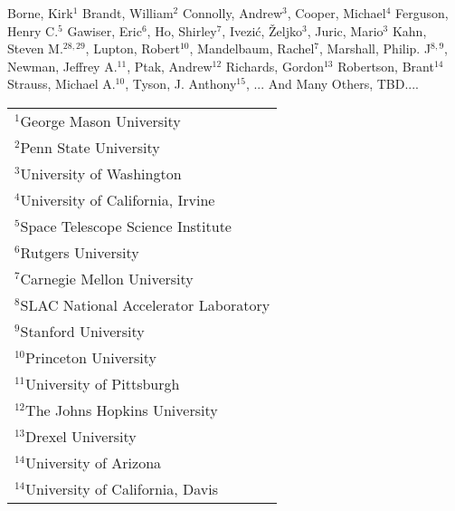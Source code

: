 Borne, Kirk$^{1}$
Brandt, William$^{2}$
Connolly, Andrew$^{3}$,
Cooper, Michael$^{4}$
Ferguson, Henry C.$^{5}$
Gawiser, Eric$^{6}$,
Ho, Shirley$^{7}$,
Ivezi\'{c}, \v{Z}eljko$^{3}$,
Juric, Mario$^{3}$
Kahn, Steven M.$^{28, 29}$,
Lupton, Robert$^{10}$,
Mandelbaum, Rachel$^{7}$,
Marshall, Philip. J$^{8,9}$,
Newman, Jeffrey A.$^{11}$,
Ptak, Andrew$^{12}$
Richards, Gordon$^{13}$
Robertson, Brant$^{14}$
Strauss, Michael A.$^{10}$,
Tyson, J. Anthony$^{15}$,
... And Many Others, TBD....

\vspace*{5mm}

\begin{table}[htdp]
\centering
{\renewcommand{\arraystretch}{0.8}
\begin{tabular}{p{10cm}}
$^{1}$George Mason University\\
$^{2}$Penn State University\\
$^{3}$University of Washington\\
$^{4}$University of California, Irvine\\
$^{5}$Space Telescope Science Institute\\
$^{6}$Rutgers University\\
$^{7}$Carnegie Mellon University\\
$^{8}$SLAC National Accelerator Laboratory\\
$^{9}$Stanford University\\
$^{10}$Princeton University\\
$^{11}$University of Pittsburgh\\
$^{12}$The Johns Hopkins University\\
$^{13}$Drexel University\\
$^{14}$University of Arizona\\
$^{14}$University of California, Davis\\
\end{tabular}
}
\end{table}
